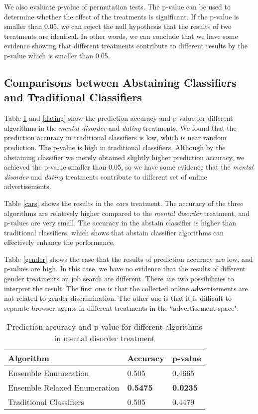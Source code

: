 \documentclass[12pt, journal]{IEEEtran}
\begin{document}
We also evaluate p-value of permutation tests.
The p-value can be used to determine whether the effect of the treatments is significant.
If the p-value is smaller than 0.05, we can reject the null hypothesis that the results of two treatments are identical.
In other words, we can conclude that we have some evidence showing that different treatments contribute to different results by the p-value which is smaller than 0.05. 


\subsection{Comparisons between Abstaining Classifiers and Traditional Classifiers}
Table \ref{mentaldisorder} and \ref{dating} show the prediction accuracy and p-value for different algorithms in the \textit{mental disorder} and \textit{dating} treatments.
We found that the prediction accuracy in traditional classifiers is low, which is near random prediction. The p-value is high in traditional classifiers. 
Although by the abstaining classifier we merely obtained slightly higher prediction accuracy, we achieved the p-value smaller than 0.05, so we have some evidence that the \textit{mental disorder} and \textit{dating} treatments contribute to different set of online advertisements.

Table \ref{cars} shows the results in the \textit{cars} treatment.
The accuracy of the three algorithms are relatively higher compared to the \textit{mental disorder} treatment, and p-values are very small.
The accuracy in the abstain classifier is higher than traditional classifiers, which shows that abstain classifier algorithms can effectively enhance the performance.

Table \ref{gender} shows the case that the results of prediction accuracy are low, and p-values are high.
In this case, we have no evidence that the results of different gender treatments on job search are different.
There are two possibilities to interpret the result. The first one is that the collected online advertisements are not related to gender discrimination. The other one is that it is difficult to separate browser agents in different treatments in the ``advertisement space".
 
\begin{table}[t]
\centering
\caption{Prediction accuracy and p-value for different algorithms in mental disorder treatment}
\label{mentaldisorder}
\begin{tabular}{|l|l|l|}
\hline
Algorithm                    & Accuracy        & p-value         \\ \hline
Ensemble Enumeration         & 0.505           & 0.4665          \\ \hline
Ensemble Relaxed Enumeration & \textbf{0.5475} & \textbf{0.0235} \\ \hline
Traditional Classifiers      & 0.505           & 0.4479          \\ \hline
\end{tabular}
\end{table}
\end{document}
